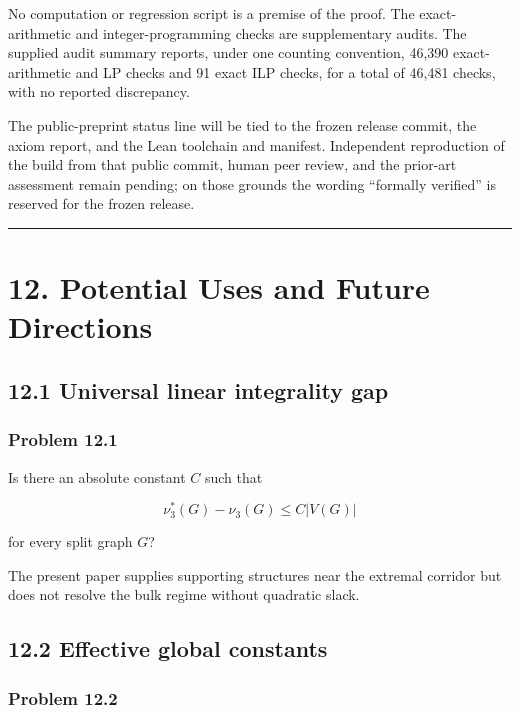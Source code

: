 \documentclass[
  11pt,
]{article}
\begin{document}
No computation or regression script is a premise of the proof. The
exact-arithmetic and integer-programming checks are supplementary
audits. The supplied audit summary reports, under one counting
convention, 46,390 exact-arithmetic and LP checks and 91 exact ILP
checks, for a total of 46,481 checks, with no reported discrepancy.

The public-preprint status line will be tied to the frozen release
commit, the axiom report, and the Lean toolchain and manifest.
Independent reproduction of the build from that public commit, human
peer review, and the prior-art assessment remain pending; on those
grounds the wording ``formally verified'' is reserved for the frozen
release.

\begin{center}\rule{0.5\linewidth}{0.5pt}\end{center}

\section{12. Potential Uses and Future
Directions}\label{potential-uses-and-future-directions}

\subsection{12.1 Universal linear integrality
gap}\label{universal-linear-integrality-gap}

\subsubsection{Problem 12.1}\label{problem-12.1}

Is there an absolute constant \(C\) such that

\[
\nu_3^*(G)-\nu_3(G)
\le C|V(G)|
\]

for every split graph \(G\)?

The present paper supplies supporting structures near the extremal
corridor but does not resolve the bulk regime without quadratic slack.

\subsection{12.2 Effective global
constants}\label{effective-global-constants}

\subsubsection{Problem 12.2}\label{problem-12.2}
\end{document}
